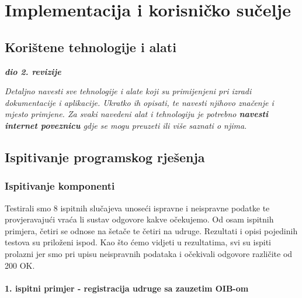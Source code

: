 \chapter{Implementacija i korisničko sučelje}
		
		
		\section{Korištene tehnologije i alati}
		
			\textbf{\textit{dio 2. revizije}}
			
			 \textit{Detaljno navesti sve tehnologije i alate koji su primijenjeni pri izradi dokumentacije i aplikacije. Ukratko ih opisati, te navesti njihovo značenje i mjesto primjene. Za svaki navedeni alat i tehnologiju je potrebno \textbf{navesti internet poveznicu} gdje se mogu preuzeti ili više saznati o njima}.
			
			
			\eject 
		
	
		\section{Ispitivanje programskog rješenja}
			
			
			\subsection{Ispitivanje komponenti}
			Testirali smo 8 ispitnih slučajeva unoseći ispravne i neispravne podatke te provjeravajući vraća li sustav odgovore kakve očekujemo. Od osam ispitnih primjera, četiri se odnose na šetače te četiri na udruge. Rezultati i opisi pojedinih testova su priloženi ispod. Kao što ćemo vidjeti u rezultatima, svi su ispiti prolazni jer smo pri upisu neispravnih podataka i očekivali odgovore različite od 200 OK.
			
			\subsubsection{1. ispitni primjer - registracija udruge sa zauzetim OIB-om}
			

